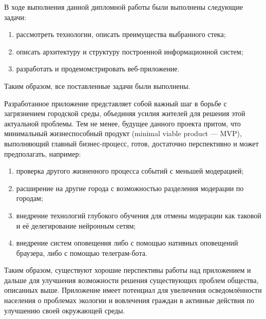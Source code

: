\documentclass[diploma]{SCWorks}
\begin{document}

\conclusion

В ходе выполнения данной дипломной работы были выполнены следующие задачи:
\begin{enumerate}
    \item рассмотреть технологии, описать преимущества выбранного стека;
    \item описать архитектуру и структуру построенной информационной систем;
    \item разработать и продемомстрировать веб-приложение.
\end{enumerate}

Таким образом, все поставленные задачи были выполнены.

Разработанное приложение представляет собой важный шаг в борьбе 
с загрязнением городской среды, объединяя усилия жителей для решения этой 
актуальной проблемы. Тем не менее, будущее данного проекта притом, что 
минимальный жизнеспособный продукт (minimal viable product — MVP), 
выполняющий главный бизнес-процесс, готов, достаточно перспективно и может 
предполагать, например:
\begin{enumerate}
    \item проверка другого жизненного процесса событий с меньшей модерацией;
    \item расширение на другие города с возможностью разделения модерации по 
    городам;
    \item внедрение технологий глубокого обучения для отмены модерации как 
    таковой и её делегирование нейронным сетям;
    \item внедрение систем оповещения либо с помощью нативных оповещений 
    браузера, либо с помощью телеграм-бота.
\end{enumerate}

Таким образом, существуют хорошие перспективы работы над приложением и 
дальше для улучшения возможности решения существующих проблем общества, 
описанных выше. Приложение имеет потенциал для увеличения осведомлённости 
населения о проблемах экологии и вовлечения граждан в активные действия по 
улучшению своей окружающей среды.

\nocite{*}



\end{document}
